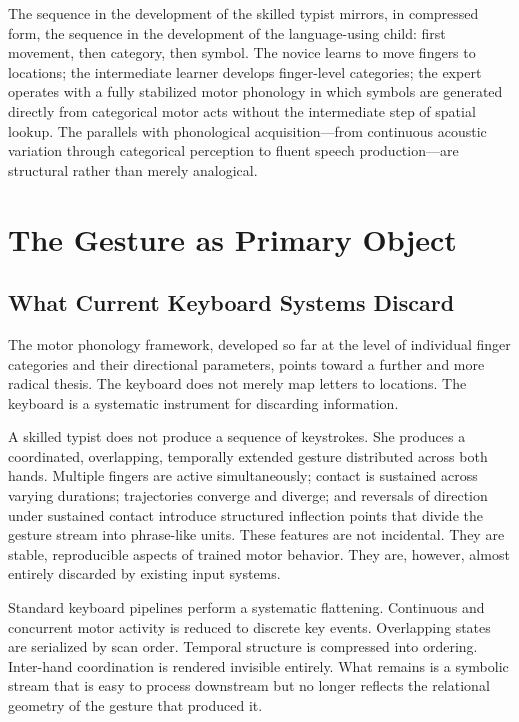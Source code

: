 \documentclass[12pt,a4paper]{article}
\theoremstyle{plain}
\theoremstyle{definition}
\theoremstyle{remark}
\begin{document}
The sequence in the development of the skilled typist mirrors, in compressed
form, the sequence in the development of the language-using child: first
movement, then category, then symbol. The novice learns to move fingers to
locations; the intermediate learner develops finger-level categories; the expert
operates with a fully stabilized motor phonology in which symbols are generated
directly from categorical motor acts without the intermediate step of spatial
lookup. The parallels with phonological acquisition---from continuous acoustic
variation through categorical perception to fluent speech production---are
structural rather than merely analogical.

\section{The Gesture as Primary Object}

\subsection{What Current Keyboard Systems Discard}

The motor phonology framework, developed so far at the level of individual
finger categories and their directional parameters, points toward a further and
more radical thesis. The keyboard does not merely map letters to locations.
The keyboard is a systematic instrument for discarding information.

A skilled typist does not produce a sequence of keystrokes. She produces a
coordinated, overlapping, temporally extended gesture distributed across both
hands. Multiple fingers are active simultaneously; contact is sustained across
varying durations; trajectories converge and diverge; and reversals of direction
under sustained contact introduce structured inflection points that divide the
gesture stream into phrase-like units. These features are not incidental. They
are stable, reproducible aspects of trained motor behavior. They are, however,
almost entirely discarded by existing input systems.

Standard keyboard pipelines perform a systematic flattening. Continuous and
concurrent motor activity is reduced to discrete key events. Overlapping states
are serialized by scan order. Temporal structure is compressed into ordering.
Inter-hand coordination is rendered invisible entirely. What remains is a
symbolic stream that is easy to process downstream but no longer reflects the
relational geometry of the gesture that produced it.
\end{document}

